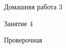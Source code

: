 \begin{homework}[number=3]
	\begin{listofex}
		\item Домашняя работа 3
	\end{listofex}
\end{homework}

\begin{class}[number=4]
	\begin{listofex}
		\item Занятие 4
	\end{listofex}
\end{class}
	
\begin{exam}
	\begin{listofex}
		\item Проверочная
	\end{listofex}
\end{exam}
